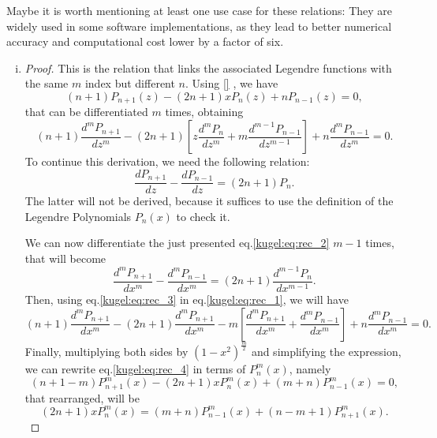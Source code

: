 Maybe it is worth mentioning at least one use case for these relations: They are widely used in some software implementations, as they lead to better numerical accuracy and computational cost lower by a factor of six\cite{usecase_recursion}.
\begin{enumerate}[(i)]
  \item 
  \begin{proof}
    This is the relation that links the associated Legendre functions with the same $m$ index but different $n$. Using \ref{} , we have 
    \begin{equation*}
      (n+1)P_{n+1}(z)-(2n+1)xP_n(z)+nP_{n-1}(z)=0,
    \end{equation*}
    that can be differentiated $m$ times, obtaining
    \begin{equation}\label{kugel:eq:rec_1}
      (n+1)\frac{d^mP_{n+1}}{dz^m}-(2n+1) \left[z \frac{d^m P_n}{dz^m}+ m\frac{d^{m-1}P_{n-1}}{dz^{m-1}} \right] + n\frac{d^m P_{n-1}}{dz^m}=0.
    \end{equation}
    To continue this derivation, we need the following relation:
    \begin{equation}\label{kugel:eq:rec_2}
      \frac{dP_{n+1}}{dz} - \frac{dP_{n-1}}{dz} = (2n+1)P_n.
    \end{equation}
    The latter will not be derived, because it suffices to use the definition of the Legendre Polynomials $P_n(x)$ to check it.
    
    We can now differentiate the just presented eq.\eqref{kugel:eq:rec_2} $m-1$ times, that will become
    \begin{equation}\label{kugel:eq:rec_3}
      \frac{d^mP_{n+1}}{dx^m} - \frac{d^mP_{n-1}}{dx^m} = (2n+1)\frac{d^{m-1}P_n}{dx^{m-1}}.
    \end{equation}
    Then, using eq.\eqref{kugel:eq:rec_3} in eq.\eqref{kugel:eq:rec_1}, we will have
    \begin{equation}\label{kugel:eq:rec_4}
      (n+1)\frac{d^mP_{n+1}}{dx^m}- (2n+1)\frac{d^mP_{n+1}}{dx^m} -m\left[\frac{d^m P_{n+1}}{dx^m}+ \frac{d^{m}P_{n-1}}{dx^m}\right] + n\frac{d^m P_{n-1}}{dx^m}=0.
    \end{equation}
    Finally, multiplying both sides by $(1-x^2)^{\frac{m}{2}}$ and simplifying the expression, we can rewrite eq.\eqref{kugel:eq:rec_4} in terms of $P^m_n(x)$, namely
    \begin{equation*}
      (n+1-m)P^m_{n+1}(x)-(2n+1)xP^m_n(x)+(m+n)P^m_{n-1}(x)=0,
    \end{equation*}
    that rearranged, will be
    \begin{equation*}
      (2n+1) x P^m_n(x)= (m+n) P^m_{n-1}(x) + (n-m+1) P^m_{n+1}(x).
    \end{equation*}
  \end{proof}
  

\end{enumerate}
